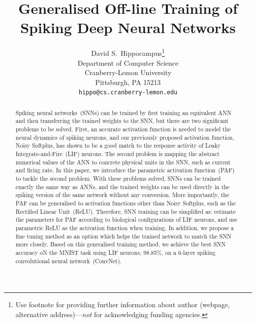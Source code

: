 \documentclass{article}
\title{Generalised Off-line Training of\\ Spiking Deep Neural Networks}
\author{
  David S.~Hippocampus\thanks{Use footnote for providing further
    information about author (webpage, alternative
    address)---\emph{not} for acknowledging funding agencies.} \\
  Department of Computer Science\\
  Cranberry-Lemon University\\
  Pittsburgh, PA 15213 \\
  \texttt{hippo@cs.cranberry-lemon.edu} \\
}
\begin{document}

\maketitle

\begin{abstract}
	Spiking neural networks~(SNNs) can be trained by first training an equivalent ANN and then transferring the trained weights to the SNN, but there are two significant problems to be solved.
	First, an accurate activation function is needed to model the neural dynamics of spiking neurons, and our previously proposed activation function, Noisy Softplus, has shown to be a good match to the response activity of Leaky Integrate-and-Fire~(LIF) neurons.
	The second problem is mapping the abstract numerical values of the ANN to concrete physical units in the SNN, such as current and firing rate.
	In this paper, we introduce the parametric activation function~(PAF) to tackle the second problem.
    With these problems solved, SNNs can be trained exactly the same way as ANNs, and the trained weights can be used directly in the spiking version of the same network without any conversion.
    More importantly, the PAF can be generalised to activation functions other than Noisy Softplus, such as the Rectified Linear Unit~(ReLU).%
    Therefore, SNN training can be simplified as: estimate the parameters for PAF according to biological configurations of LIF neurons, and use parametric ReLU as the activation function when training.
    In addition, we propose a fine tuning method as an option which helps the trained network to match the SNN more closely.
    Based on this generalised training method, we achieve the best SNN accuracy oN the MNIST task using LIF neurons, 98.85\%, on a 6-layer spiking convolutional neural network~(ConvNet).
    


 
\end{abstract}
\end{document}

